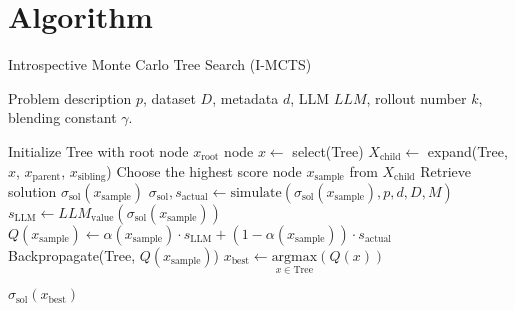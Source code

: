 \newpage
\section{Algorithm}

\begin{algorithm}[H]
    \caption{Introspective Monte Carlo Tree Search (I-MCTS)}
    \begin{algorithmic}[1]
        \REQUIRE Problem description $p$, dataset $D$, metadata $d$, LLM $LLM$, rollout number $k$, blending constant $\gamma$.
        
        \STATE Initialize Tree with root node $x_{\text{root}}$
            \STATE node $x \leftarrow$ select(Tree) 
            \STATE $X_{\text{child}} \leftarrow$ expand(Tree, $x$, $x_{\text{parent}}$, $x_{\text{sibling}}$) 
            \STATE Choose the highest score node $x_{\text{sample}}$ from $X_{\text{child}}$
            \STATE Retrieve solution $\sigma_{\text{sol}}(x_{\text{sample}})$
            \STATE $\sigma_{\text{sol}}, s_{\text{actual}} \leftarrow \text{simulate}(\sigma_{\text{sol}}(x_{\text{sample}}), p, d, D, M)$
            \STATE $s_{\text{LLM}} \leftarrow LLM_{\text{value}}(\sigma_{\text{sol}}(x_{\text{sample}}))$
            \STATE $Q(x_{\text{sample}}) \leftarrow \alpha(x_{\text{sample}}) \cdot s_{\text{LLM}} + (1 - \alpha(x_{\text{sample}})) \cdot s_{\text{actual}}$
            \STATE Backpropagate(Tree, $Q(x_{\text{sample}})$)
        \ENDFOR
        \STATE $x_{\text{best}} \leftarrow \underset{x \in \text{Tree}}{\text{argmax}}(Q(x))$

        \ENSURE $\sigma_{\text{sol}}(x_{\text{best}})$
    \end{algorithmic}
    \label{alg:i-mcts}
\end{algorithm}

